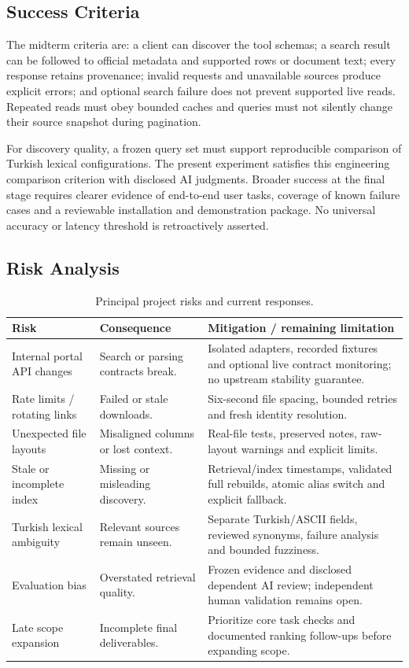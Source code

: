 \documentclass[a4paper,12pt]{report}
\begin{document}
\subsection{Success Criteria}
The midterm criteria are: a client can discover the tool schemas; a search result can be followed to official metadata and supported rows or document text; every response retains provenance; invalid requests and unavailable sources produce explicit errors; and optional search failure does not prevent supported live reads. Repeated reads must obey bounded caches and queries must not silently change their source snapshot during pagination.

For discovery quality, a frozen query set must support reproducible comparison of Turkish lexical configurations. The present experiment satisfies this engineering comparison criterion with disclosed AI judgments. Broader success at the final stage requires clearer evidence of end-to-end user tasks, coverage of known failure cases and a reviewable installation and demonstration package. No universal accuracy or latency threshold is retroactively asserted.

\subsection{Risk Analysis}
\begin{table}[H]
\caption{Principal project risks and current responses.}
\label{tab:risks}
\centering\renewcommand{\baselinestretch}{1}\small\renewcommand{\arraystretch}{1.15}
\begin{tabular}{L{34mm} L{46mm} L{62mm}}
\toprule Risk & Consequence & Mitigation / remaining limitation \\
\midrule
Internal portal API changes & Search or parsing contracts break. & Isolated adapters, recorded fixtures and optional live contract monitoring; no upstream stability guarantee. \\
Rate limits / rotating links & Failed or stale downloads. & Six-second file spacing, bounded retries and fresh identity resolution. \\
Unexpected file layouts & Misaligned columns or lost context. & Real-file tests, preserved notes, raw-layout warnings and explicit limits. \\
Stale or incomplete index & Missing or misleading discovery. & Retrieval/index timestamps, validated full rebuilds, atomic alias switch and explicit fallback. \\
Turkish lexical ambiguity & Relevant sources remain unseen. & Separate Turkish/ASCII fields, reviewed synonyms, failure analysis and bounded fuzziness. \\
Evaluation bias & Overstated retrieval quality. & Frozen evidence and disclosed dependent AI review; independent human validation remains open. \\
Late scope expansion & Incomplete final deliverables. & Prioritize core task checks and documented ranking follow-ups before expanding scope. \\
\bottomrule
\end{tabular}
\end{table}
\end{document}
